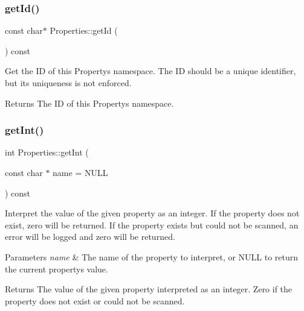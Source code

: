 \subsubsection{\texorpdfstring{get\+Id()}{getId()}\hspace{0.1cm}{\footnotesize\ttfamily [2/2]}}
{\footnotesize\ttfamily const char$\ast$ Properties\+::get\+Id (\begin{DoxyParamCaption}{ }\end{DoxyParamCaption}) const}

Get the ID of this Property\textquotesingle{}s namespace. The ID should be a unique identifier, but its uniqueness is not enforced.

\begin{DoxyReturn}{Returns}
The ID of this Property\textquotesingle{}s namespace. 
\end{DoxyReturn}
\mbox{\label{classProperties_abbea452c3b133805fa955a6e1f91d1db}} 
\subsubsection{\texorpdfstring{get\+Int()}{getInt()}\hspace{0.1cm}{\footnotesize\ttfamily [1/2]}}
{\footnotesize\ttfamily int Properties\+::get\+Int (\begin{DoxyParamCaption}\item[{const char $\ast$}]{name = {\ttfamily NULL} }\end{DoxyParamCaption}) const}

Interpret the value of the given property as an integer. If the property does not exist, zero will be returned. If the property exists but could not be scanned, an error will be logged and zero will be returned.


\begin{DoxyParams}{Parameters}
{\em name} & The name of the property to interpret, or N\+U\+LL to return the current property\textquotesingle{}s value.\\
\hline
\end{DoxyParams}
\begin{DoxyReturn}{Returns}
The value of the given property interpreted as an integer. Zero if the property does not exist or could not be scanned. 
\end{DoxyReturn}
\mbox{\label{classProperties_abbea452c3b133805fa955a6e1f91d1db}} 
